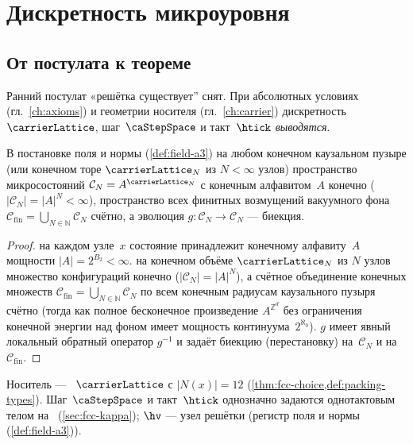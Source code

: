 \chapter{Дискретность микроуровня}
\label{ch:foundations}

\section{От постулата к теореме}

Ранний постулат «решётка существует'' снят.
При абсолютных условиях (гл.~\ref{ch:axioms}) и геометрии носителя (гл.~\ref{ch:carrier})
дискретность~$\carrierLattice$, шаг~$\caStepSpace$ и такт~$\htick$ \emph{выводятся}.

\begin{lemma}
\label{lem:countable-config}
В постановке поля и нормы (\cref{def:field-a3}) на любом конечном каузальном пузыре (или конечном торе $\carrierLattice_N$ из $N<\infty$ узлов) пространство микросостояний $\mathcal{C}_N = A^{\carrierLattice_N}$ с конечным алфавитом~$A$ конечно ($|\mathcal{C}_N| = |A|^N < \infty$), пространство всех финитных возмущений вакуумного фона $\mathcal{C}_{\mathrm{fin}} = \bigcup_{N\in\mathbb{N}}\mathcal{C}_N$ счётно, а эволюция $g:\mathcal{C}_N\to\mathcal{C}_N$ --- биекция.
\end{lemma}

\begin{proof}
на каждом узле~$x$ состояние принадлежит конечному алфавиту~$A$ мощности $|A| = 2^{B_2} < \infty$.
\phence на конечном объёме $\carrierLattice_N$ из $N$ узлов множество конфигураций конечно ($|\mathcal{C}_N| = |A|^N$), а счётное объединение конечных множеств $\mathcal{C}_{\mathrm{fin}} = \bigcup_{N\in\mathbb{N}}\mathcal{C}_N$ по всем конечным радиусам каузального пузыря счётно (тогда как полное бесконечное произведение $A^{\mathbb{Z}^d}$ без ограничения конечной энергии над фоном имеет мощность континуума~$2^{\aleph_0}$).
$g$ имеет явный локальный обратный оператор $g^{-1}$ и задаёт биекцию (перестановку) на~$\mathcal{C}_N$ и на~$\mathcal{C}_{\mathrm{fin}}$.
\end{proof}

\begin{lemma}
\label{lem:fcc-scale}
Носитель --- \latGCK\ $\carrierLattice$ с $|N(x)|=12$ (\cref{thm:fcc-choice,def:packing-types}).
Шаг~$\caStepSpace$ и такт~$\htick$ однозначно задаются однотактовым телом на \latGCKshort\ (\cref{sec:fcc-kappa});
$\hv$ --- узел решётки (регистр поля и нормы (\cref{def:field-a3})).
\end{lemma}


